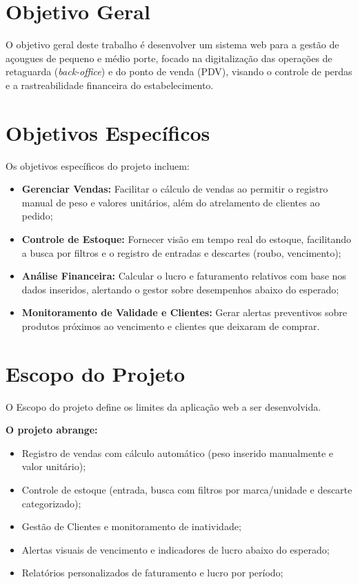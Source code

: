 \documentclass[
	12pt,				%
	openany,			%
	oneside,			%
	a4paper,			%
	english,			%
	french,				%
	spanish,			%
	brazil				%
	]{abntex2}
\begin{document}
\section{Objetivo Geral}
O objetivo geral deste trabalho é desenvolver um sistema web para a gestão de açougues de pequeno e médio porte, focado na digitalização das operações de retaguarda (\textit{back-office}) e do ponto de venda (PDV), visando o controle de perdas e a rastreabilidade financeira do estabelecimento.

\section{Objetivos Específicos}
Os objetivos específicos do projeto incluem:

\begin{itemize}
    \item \textbf{Gerenciar Vendas:} Facilitar o cálculo de vendas ao permitir o registro manual de peso e valores unitários, além do atrelamento de clientes ao pedido;
    \item \textbf{Controle de Estoque:} Fornecer visão em tempo real do estoque, facilitando a busca por filtros e o registro de entradas e descartes (roubo, vencimento);
    \item \textbf{Análise Financeira:} Calcular o lucro e faturamento relativos com base nos dados inseridos, alertando o gestor sobre desempenhos abaixo do esperado;
    \item \textbf{Monitoramento de Validade e Clientes:} Gerar alertas preventivos sobre produtos próximos ao vencimento e clientes que deixaram de comprar.
\end{itemize}

\section{Escopo do Projeto}

O Escopo do projeto define os limites da aplicação web a ser desenvolvida.

\noindent\textbf{O projeto abrange:}
\begin{itemize}
    \item Registro de vendas com cálculo automático (peso inserido manualmente e valor unitário);
    \item Controle de estoque (entrada, busca com filtros por marca/unidade e descarte categorizado);
    \item Gestão de Clientes e monitoramento de inatividade;
    \item Alertas visuais de vencimento e indicadores de lucro abaixo do esperado;
    \item Relatórios personalizados de faturamento e lucro por período;
\end{itemize}
\end{document}
